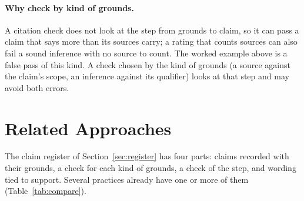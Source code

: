 \documentclass[12pt, a4paper]{article}
\begin{document}
\paragraph{Why check by kind of grounds.}
A citation check does not look at the step from grounds to claim, so it
can pass a claim that says more than its sources carry; a rating that
counts sources can also fail a sound inference with no source to count.
The worked example above is a false pass of this kind.
A check chosen by the kind of grounds (a source against the claim's scope,
an inference against its qualifier) looks at that step and may avoid both
errors.

\section{Related Approaches}
\label{sec:related}

The claim register of Section~\ref{sec:register} has four parts: claims recorded with their grounds, a check for each kind of grounds, a check of the step, and wording tied to support.  Several practices already have one or more of them (Table~\ref{tab:compare}).
\end{document}
